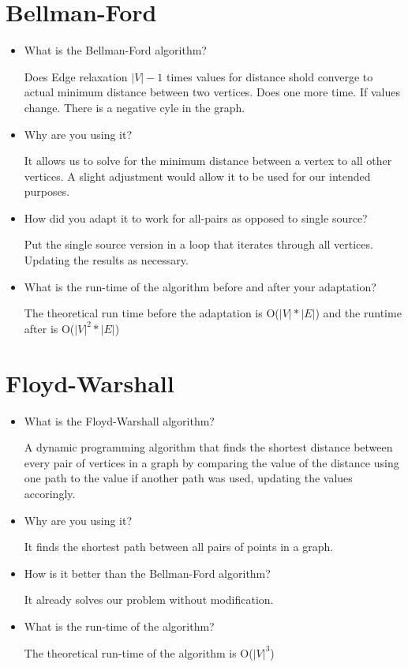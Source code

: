 \documentclass[twocolumn]{article}
\begin{document}
\section{Bellman-Ford}
\begin{itemize}
    \item What is the Bellman-Ford algorithm?
    
    Does Edge relaxation $|V|-1$ times values for distance shold converge to actual minimum distance between two vertices. Does one more time. If values change. There is a negative cyle in the graph. 
    
    \item Why are you using it?
    
    It allows us to solve for the minimum distance between a vertex to all other vertices. A slight adjustment would allow it to be used for our intended purposes.
    
    \item How did you adapt it to work for all-pairs as opposed to single
    source?
    
    Put the single source version in a loop that iterates through all vertices. Updating the results as necessary.
    
    \item What is the run-time of the algorithm before and after your
    adaptation?
    
    The theoretical run time before the adaptation is O($|V| * |E|$) and the runtime after is O($|V|^{2} * |E|$) 
    
\end{itemize}

\section{Floyd-Warshall}
\begin{itemize}
    \item What is the Floyd-Warshall algorithm?
    
    A dynamic programming algorithm that finds the shortest distance between every pair of vertices in a graph by comparing the value of the distance using one path to the value if another path was used, updating the values accoringly.
    
    \item Why are you using it?
    
    It finds the shortest path between all pairs of points in a graph.
    
    \item How is it better than the Bellman-Ford algorithm?
    
    It already solves our problem without modification.
    
    \item What is the run-time of the algorithm?
    
    The theoretical run-time of the algorithm is O($|V|^{3}$)
    
\end{itemize}
\end{document}
